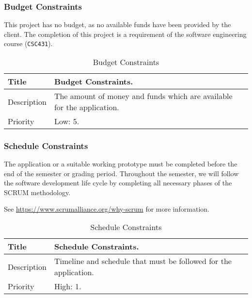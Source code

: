 \subsubsection{Budget Constraints}
  \label{system-constraints/budget-and-schedule/budget-title}
  This project has no budget, as no available funds have been provided by the
  client. The completion of this project is a requirement of the software
  engineering course (\texttt{CSC431}).

  \begin{table}[h!]
    \caption{Budget Constraints}
    \label{system-constraints/budget-and-schedule/budget-table}
    \begin{tabularx}{\textwidth}{|l|X|}
      \hline
      Title       & Budget Constraints. \\ \hline
      Description & The amount of money and funds which are available for the
                    application. \\ \hline
      Priority    & Low: 5. \\ \hline
    \end{tabularx}
  \end{table}

\subsubsection{Schedule Constraints}
  The application or a suitable working prototype must be completed before the
  end of the semester or grading period. Throughout the semester, we will follow
  the software development life cycle by completing all necessary phases of the
  SCRUM methodology.

  See \url{https://www.scrumalliance.org/why-scrum} for more information.

  \begin{table}[h!]
    \caption{Schedule Constraints}
    \label{system-constraints/budget-and-schedule/schedule-table}
    \begin{tabularx}{\textwidth}{|l|X|}
      \hline
      Title       & Schedule Constraints. \\ \hline
      Description & Timeline and schedule that must be followed for the
                    application. \\ \hline
      Priority    & High: 1. \\ \hline
    \end{tabularx}
  \end{table}
